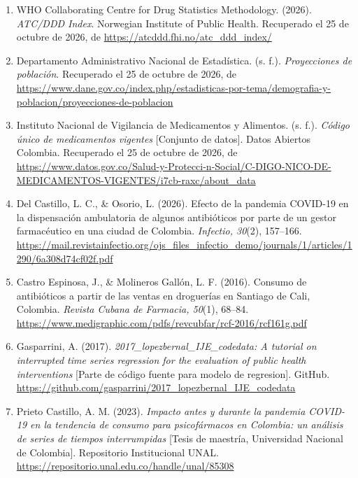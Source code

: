 \documentclass[10pt,twoside,xcolor=table,x11anmes]{IEEEtran}
\begin{document}
\begin{enumerate}
  \item WHO Collaborating Centre for Drug Statistics Methodology. (2026).
  \emph{ATC/DDD Index}. Norwegian Institute of Public Health.
  Recuperado el 25 de octubre de 2026, de
  \url{https://atcddd.fhi.no/atc_ddd_index/}

  \item Departamento Administrativo Nacional de Estadística. (s. f.).
  \emph{Proyecciones de población}.
  Recuperado el 25 de octubre de 2026, de
  \url{https://www.dane.gov.co/index.php/estadisticas-por-tema/demografia-y-poblacion/proyecciones-de-poblacion}

  \item Instituto Nacional de Vigilancia de Medicamentos y Alimentos. (s. f.).
  \emph{Código único de medicamentos vigentes} [Conjunto de datos].
  Datos Abiertos Colombia. Recuperado el 25 de octubre de 2026, de
  \url{https://www.datos.gov.co/Salud-y-Protecci-n-Social/C-DIGO-NICO-DE-MEDICAMENTOS-VIGENTES/i7cb-raxc/about_data}

  \item Del Castillo, L. C., \& Osorio, L. (2026). Efecto de la pandemia COVID-19 en la dispensación ambulatoria de algunos antibióticos por parte de un gestor farmacéutico en una ciudad de Colombia. \textit{Infectio, 30}(2), 157--166. \url{https://mail.revistainfectio.org/ojs_files_infectio_demo/journals/1/articles/1290/6a308d74cf02f.pdf}

  \item Castro Espinosa, J., \& Molineros Gallón, L. F. (2016). Consumo de antibióticos a partir de las ventas en droguerías en Santiago de Cali, Colombia. \textit{Revista Cubana de Farmacia, 50}(1), 68--84. \url{https://www.medigraphic.com/pdfs/revcubfar/rcf-2016/rcf161g.pdf}

  \item Gasparrini, A. (2017). \textit{2017\_lopezbernal\_IJE\_codedata: A tutorial on interrupted time series regression for the evaluation of public health interventions} [Parte de código fuente para modelo de regresion]. GitHub. \url{https://github.com/gasparrini/2017_lopezbernal_IJE_codedata}

  \item Prieto Castillo, A. M. (2023). \textit{Impacto antes y durante la pandemia COVID-19 en la tendencia de consumo para psicofármacos en Colombia: un análisis de series de tiempos interrumpidas} [Tesis de maestría, Universidad Nacional de Colombia]. Repositorio Institucional UNAL. \url{https://repositorio.unal.edu.co/handle/unal/85308}


\end{enumerate}
\end{document}
